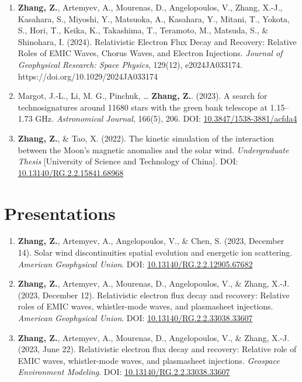 \documentclass[
  letterpaper,
  DIV=11,
  numbers=noendperiod]{scrartcl}
\begin{document}
\begin{enumerate}
\def\labelenumi{\arabic{enumi}.}
\item
  \textbf{Zhang, Z.}, Artemyev, A., Mourenas, D., Angelopoulos, V., Zhang, X.-J., Kasahara, S., Miyoshi, Y., Matsuoka, A., Kasahara, Y., Mitani, T., Yokota, S., Hori, T., Keika, K., Takashima, T., Teramoto, M., Matsuda, S., \& Shinohara, I. (2024). Relativistic Electron Flux Decay and Recovery: Relative Roles of EMIC Waves, Chorus Waves, and Electron Injections. \emph{Journal of Geophysical Research: Space Physics}, 129(12), e2024JA033174. https://doi.org/10.1029/2024JA033174
\item
  Margot, J.-L., Li, M. G., Pinchuk, \ldots{} \textbf{Zhang, Z.}. (2023). A search for technosignatures around 11680 stars with the green bank telescope at 1.15--1.73 GHz. \emph{Astronomical Journal}, 166(5), 206. DOI: \href{https://doi.org/10.3847/1538-3881/acfda4}{10.3847/1538-3881/acfda4}
\item
  \textbf{Zhang, Z.}, \& Tao, X. (2022). The kinetic simulation of the interaction between the Moon's magnetic anomalies and the solar wind. \emph{Undergraduate Thesis} {[}University of Science and Technology of China{]}. DOI: \href{http://dx.doi.org/10.13140/RG.2.2.15841.68968}{10.13140/RG.2.2.15841.68968}
\end{enumerate}

\section{Presentations}\label{presentations}

\begin{enumerate}
\def\labelenumi{\arabic{enumi}.}
\item
  \textbf{Zhang, Z.}, Artemyev, A., Angelopoulos, V., \& Chen, S. (2023, December 14). Solar wind discontinuities spatial evolution and energetic ion scattering. \emph{American Geophysical Union}. DOI: \href{https://doi.org/10.13140/RG.2.2.12905.67682}{10.13140/RG.2.2.12905.67682}
\item
  \textbf{Zhang, Z.}, Artemyev, A., Mourenas, D., Angelopoulos, V., \& Zhang, X.-J. (2023, December 12). Relativistic electron flux decay and recovery: Relative roles of EMIC waves, whistler-mode waves, and plasmasheet injections. \emph{American Geophysical Union}. DOI: \href{https://doi.org/10.13140/RG.2.2.33038.33607}{10.13140/RG.2.2.33038.33607}
\item
  \textbf{Zhang, Z.}, Artemyev, A., Mourenas, D., Angelopoulos, V., \& Zhang, X.-J. (2023, June 22). Relativistic electron flux decay and recovery: Relative role of EMIC waves, whistler-mode waves, and plasmasheet injections. \emph{Geospace Environment Modeling}. DOI: \href{http://dx.doi.org/10.13140/RG.2.2.33038.33607}{10.13140/RG.2.2.33038.33607}
\end{enumerate}
\end{document}
